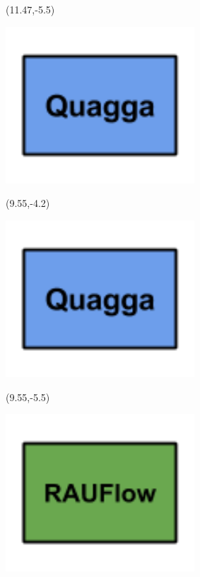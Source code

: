 \documentclass{beamer}
\begin{document}
\begin{frame}
\begin{textblock}{3}(11.47,-5.5)
\begin{minipage}{\textwidth}
\setlength{\parindent}{0pt}
\setlength{\parskip}{0.1cm}
\includegraphics[width=0.53\textwidth, right]{imagenes/buildingblockquagga.png}
\end{minipage}
\end{textblock}

\begin{textblock}{3}(9.55,-4.2)
\begin{minipage}{\textwidth}
\setlength{\parindent}{0pt}
\setlength{\parskip}{0.1cm}
\includegraphics[width=0.53\textwidth, right]{imagenes/buildingblockquagga.png}
\end{minipage}
\end{textblock}

\begin{textblock}{3}(9.55,-5.5)
\begin{minipage}{\textwidth}
\setlength{\parindent}{0pt}
\setlength{\parskip}{0.1cm}
\includegraphics[width=0.53\textwidth, right]{imagenes/buldingblockrauflow.png}
\end{minipage}
\end{textblock}


\end{frame}
\end{document}
